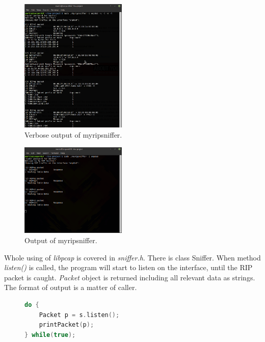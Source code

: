 \documentclass[10pt,a4paper,titlepage]{article}
\begin{document}
            \begin{figure}[h!]
                \begin{center}
                    \includegraphics[width=0.45\textwidth]{snifferoutput.png}
                    \caption{Verbose output of myripsniffer. \label{fig:MyRipSniffer}}
                \end{center}
            \end{figure}

            \begin{figure}[h!]
                \begin{center}
                    \includegraphics[width=0.45\textwidth]{snifferoutputbrief.png}
                    \caption{Output of myripsniffer. \label{fig:MyRipSnifferBrief}}
                \end{center}
            \end{figure}

            Whole using of {\it libpcap} is covered in {\it sniffer.h}. There is class Sniffer. When method {\it listen()} is called,
            the program will start to listen on the interface, until the RIP packet is caught. {\it Packet} object is returned 
            including all relevant data as strings. The format of output is a matter of caller.
            \begin{figure}[h!]
            \begin{lstlisting}[language=c, basicstyle=\tiny]
do {
    Packet p = s.listen();
    printPacket(p);
} while(true);
            \end{lstlisting}
            \end{figure}
            
\end{document}
